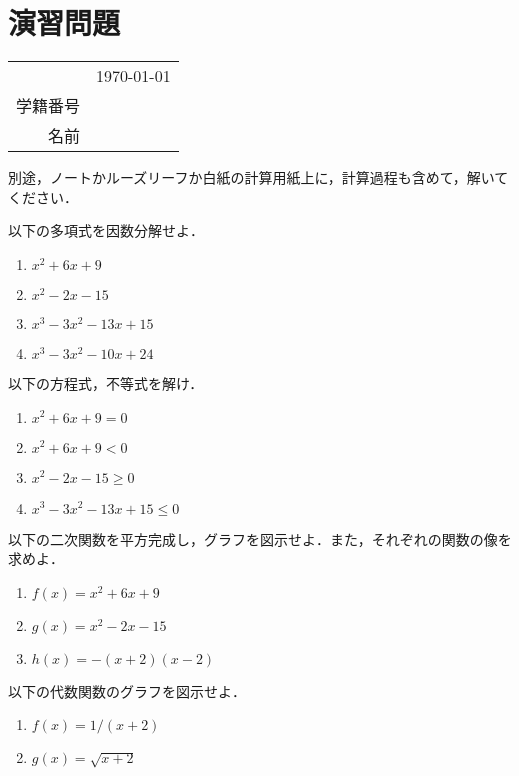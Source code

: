 \section*{演習問題}
\begin{table}[!t]
	\begin{flushright}
		\begin{tabular}{rc}
			& \usdate\today \\
			学籍番号 & \\
			名前 & \\
		\end{tabular}
	\end{flushright}
\end{table}

別途，ノートかルーズリーフか白紙の計算用紙上に，計算過程も含めて，解いてください．

\begin{question}
	以下の多項式を因数分解せよ．
	\begin{enumerate}[(1)]
		\item $x^2+6x+9$
		\item $x^2-2x-15$
		\item $x^3 - 3 x^2 - 13 x + 15$
		\item $x^3 - 3 x^2 - 10 x + 24$
	\end{enumerate}
\end{question}

\begin{question}
	以下の方程式，不等式を解け．
	\begin{enumerate}[(1)]
		\item $x^2+6x+9 = 0$
		\item $x^2+6x+9 < 0$
		\item $x^2-2x-15 \geq 0$
		\item $x^3 - 3 x^2 - 13 x + 15 \leq 0$
	\end{enumerate}
\end{question}

\begin{question}
	以下の二次関数を平方完成し，グラフを図示せよ．また，それぞれの関数の像を求めよ．
	\begin{enumerate}[(1)]
		\item $f(x) = x^2+6x+9$
		\item $g(x) = x^2-2x-15$
		\item $h(x) = -(x+2)(x-2)$
	\end{enumerate}
\end{question}

\begin{question}
	以下の代数関数のグラフを図示せよ．
	\begin{enumerate}[(1)]
		\item $f(x) = 1/(x+2)$
		\item $g(x) = \sqrt{x+2}$
	\end{enumerate}
\end{question}

